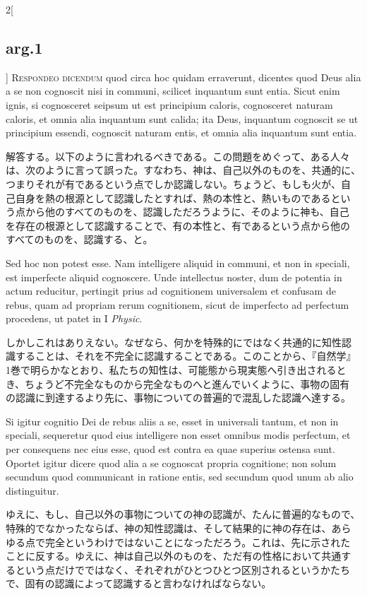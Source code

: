 \documentclass[paper=a4paper,fontsize=10pt,jafontsize=9pt,titlepage]{jlreq}
\begin{document}
\begin{paracol}{2}[\subsection{arg.1}]
{\scshape Respondeo dicendum} quod circa hoc quidam erraverunt,
dicentes quod Deus alia a se non cognoscit nisi in communi, scilicet
inquantum sunt entia. Sicut enim ignis, si cognosceret seipsum ut est
principium caloris, cognosceret naturam caloris, et omnia alia
inquantum sunt calida; ita Deus, inquantum cognoscit se ut principium
essendi, cognoscit naturam entis, et omnia alia inquantum sunt entia.

\switchcolumn

解答する。以下のように言われるべきである。この問題をめぐって、ある人々
は、次のように言って誤った。すなわち、神は、自己以外のものを、共通的に、
つまりそれが有であるという点でしか認識しない。ちょうど、もしも火が、自
己自身を熱の根源として認識したとすれば、熱の本性と、熱いものであるとい
う点から他のすべてのものを、認識しただろうように、そのように神も、自己
を存在の根源として認識することで、有の本性と、有であるという点から他の
すべてのものを、認識する、と。

\switchcolumn*

Sed hoc non potest esse. Nam intelligere aliquid in communi, et non in
speciali, est imperfecte aliquid cognoscere. Unde intellectus noster,
dum de potentia in actum reducitur, pertingit prius ad cognitionem
universalem et confusam de rebus, quam ad propriam rerum cognitionem,
sicut de imperfecto ad perfectum procedens, ut patet in I {\itshape
Physic}.

\switchcolumn

しかしこれはありえない。なぜなら、何かを特殊的にではなく共通的に知性認
識することは、それを不完全に認識することである。このことから、『自然学』
1巻で明らかなとおり、私たちの知性は、可能態から現実態へ引き出されると
き、ちょうど不完全なものから完全なものへと進んでいくように、事物の固有
の認識に到達するより先に、事物についての普遍的で混乱した認識へ達する。

\switchcolumn*

Si igitur cognitio Dei de rebus aliis a se, esset in universali
tantum, et non in speciali, sequeretur quod eius intelligere non esset
omnibus modis perfectum, et per consequens nec eius esse, quod est
contra ea quae superius ostensa sunt. Oportet igitur dicere quod alia
a se cognoscat propria cognitione; non solum secundum quod communicant
in ratione entis, sed secundum quod unum ab alio distinguitur.

\switchcolumn

ゆえに、もし、自己以外の事物についての神の認識が、たんに普遍的なもので、
特殊的でなかったならば、神の知性認識は、そして結果的に神の存在は、あら
ゆる点で完全というわけではないことになっただろう。これは、先に示された
ことに反する。ゆえに、神は自己以外のものを、ただ有の性格において共通す
るという点だけでではなく、それぞれがひとつひとつ区別されるというかたち
で、固有の認識によって認識すると言わなければならない。


\end{paracol}
\end{document}
